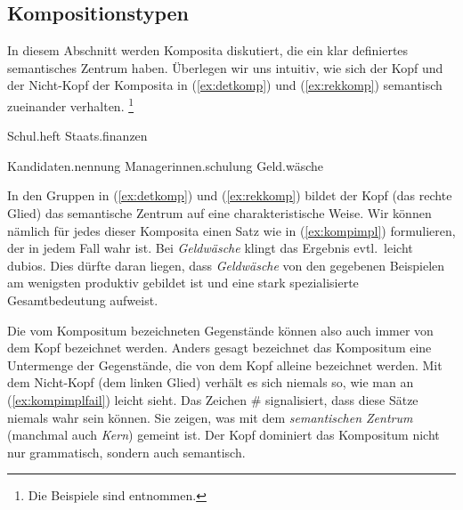 \subsection{Kompositionstypen}

\label{sec:detrekkomp}


In diesem Abschnitt werden Komposita diskutiert, die ein klar definiertes semantisches Zentrum haben.
Überlegen wir uns intuitiv, wie sich der Kopf und der Nicht-Kopf der Komposita in (\ref{ex:detkomp}) und (\ref{ex:rekkomp}) semantisch zueinander verhalten.%
\footnote{Die Beispiele sind \citealp[217ff.]{Eisenberg1} entnommen.}

\begin{exe}
  \ex\label{ex:detkomp}
  \begin{xlist}
  	\ex Schul.heft
  	\ex Staats.finanzen
  \end{xlist}
  \ex\label{ex:rekkomp}
  \begin{xlist}
    \ex Kandidaten.nennung
    \ex Managerinnen.schulung
    \ex Geld.wäsche
  \end{xlist}
\end{exe}

In den Gruppen in (\ref{ex:detkomp}) und (\ref{ex:rekkomp}) bildet der Kopf (das rechte Glied) das semantische Zentrum auf eine charakteristische Weise.
Wir können nämlich für jedes dieser Komposita einen Satz wie in (\ref{ex:kompimpl}) formulieren, der in jedem Fall wahr ist.
Bei \textit{Geldwäsche} klingt das Ergebnis evtl.\ leicht dubios.
Dies dürfte daran liegen, dass \textit{Geldwäsche} von den gegebenen Beispielen am wenigsten produktiv gebildet ist und eine stark spezialisierte Gesamtbedeutung aufweist.

\begin{exe}
  \ex\label{ex:kompimpl}
  \begin{xlist}
  \end{xlist}
\end{exe}

Die vom Kompositum bezeichneten Gegenstände können also auch immer von dem Kopf bezeichnet werden.
Anders gesagt bezeichnet das Kompositum eine Untermenge der Gegenstände, die von dem Kopf alleine bezeichnet werden.
Mit dem Nicht-Kopf (dem linken Glied) verhält es sich niemals so, wie man an (\ref{ex:kompimplfail}) leicht sieht.
Das Zeichen \# signalisiert, dass diese Sätze niemals wahr sein können.
Sie zeigen, was mit dem \textit{semantischen Zentrum} (manchmal auch \textit{Kern}) gemeint ist.
Der Kopf dominiert das Kompositum nicht nur grammatisch, sondern auch semantisch.

